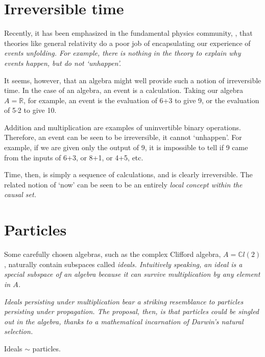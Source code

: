 \documentclass[letterpaper,12pt,titlepage,oneside,final]{book}
\newcommand{\CLtwo}{\mathbb{C}l(2)}
\begin{document}
\section{Irreversible time}

Recently, it has been emphasized in the fundamental physics community, \cite{fqxi}, that theories like general relativity do a poor job of encapsulating our experience of \it events unfolding. \rm For example, there is nothing in the theory to explain why events happen, but do not `unhappen'.

It seems, however, that an algebra might well provide such a  notion of irreversible time.    In the case of an algebra, an event is a calculation.  Taking our algebra $A=\mathbb{R}$, for example, an event is the evaluation of 6+3 to give 9, or the evaluation of 5$\cdot$2 to give 10.  

Addition and multiplication are examples of uninvertible binary operations.  Therefore, an event can be seen to be irreversible, it cannot `unhappen'.  For example, if we are given only the output of 9, it is impossible to tell if 9 came from the inputs of 6+3, or 8+1, or 4+5, etc.


Time, then, is simply a sequence of calculations, and is clearly irreversible.  
The related notion of `now' can be seen to be an entirely \it local \rm concept within the causal set.


\section{Particles}


Some carefully chosen algebras, such as the complex Clifford algebra, $A=\CLtwo$, naturally contain subspaces called \it ideals. \rm  Intuitively speaking, an ideal  is a special subspace of an algebra because it can survive multiplication by any element in $A$.  

\it Ideals \rm persisting under multiplication bear a striking resemblance to \it particles \rm persisting under propagation.  The proposal, then, is that particles could be singled out in the algebra, thanks to a mathematical incarnation of Darwin's natural selection.   

\begin{center} Ideals $\sim$ particles.
\end{center}
\end{document}

